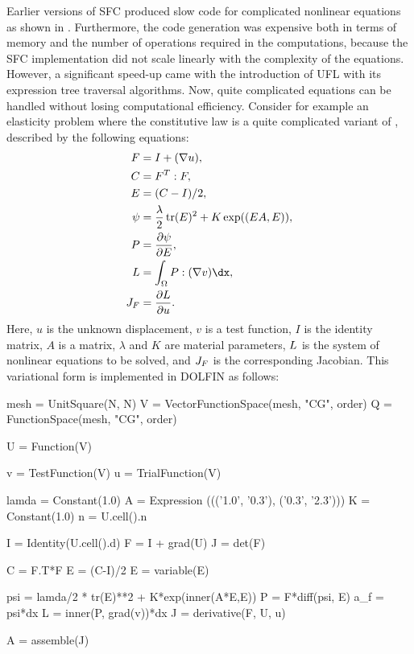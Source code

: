 Earlier versions of SFC produced slow code for complicated nonlinear
equations as shown in \citet{AlnaesMardal2009b}. Furthermore, the code
generation was expensive both in terms of memory and the number of
operations required in the computations, because the SFC implementation
did not scale linearly with the complexity of the equations.  However, a
significant speed-up came with the introduction of UFL with its expression
tree traversal algorithms.  Now, quite complicated equations can be
handled without losing computational efficiency. Consider for example
an elasticity problem where the constitutive law is a quite complicated
variant of \citet{Fung1993}, described by the following equations:
%
\begin{align}
F &= I + (\nabla u), \\
C &= F^T: F, \\
E &= (C-I)/2, \\
\psi &= \frac{\lambda}{2} \, \mbox{tr}(E)^2 + K\exp((E A,E)), \\
P &= \frac{\partial \psi}{\partial E}, \\
\LL &= \int_\Omega P: (\nabla v) \dx, \\
\JJ_F &= \frac{\partial \LL}{\partial u}.
\end{align}
Here, $u$ is the unknown displacement, $v$ is a
test function, $I$ is the identity matrix, $A$ is a
matrix, $\lambda$ and $K$ are material parameters, $L$ is the system
of nonlinear equations to be solved, and $J_F$ is the corresponding
Jacobian.  This variational form is implemented in DOLFIN as follows:
\begin{python}
mesh = UnitSquare(N, N)
V = VectorFunctionSpace(mesh, "CG", order)
Q = FunctionSpace(mesh, "CG", order)

U = Function(V)

v = TestFunction(V)
u = TrialFunction(V)

lamda = Constant(1.0)
A = Expression ((('1.0', '0.3'), ('0.3', '2.3')))
K = Constant(1.0)
n = U.cell().n

I = Identity(U.cell().d)
F = I + grad(U)
J = det(F)

C = F.T*F
E = (C-I)/2
E = variable(E)

psi = lamda/2 * tr(E)**2  +  K*exp(inner(A*E,E))
P = F*diff(psi, E)
a_f = psi*dx
L = inner(P, grad(v))*dx
J = derivative(F, U, u)

A = assemble(J)
\end{python}

